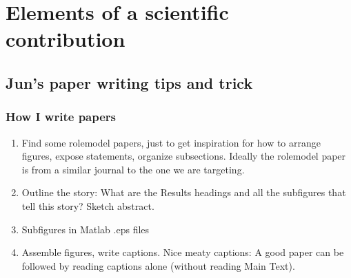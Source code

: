 \documentclass[letterpaper,10pt,english]{sphinxmanual}
\begin{document}
\chapter{Elements of a scientific contribution}
\label{\detokenize{02Elements:elements-of-a-scientific-contribution}}\label{\detokenize{02Elements::doc}}

\section{Jun’s paper writing tips and trick}
\label{\detokenize{PaperWritingTips:jun-s-paper-writing-tips-and-trick}}\label{\detokenize{PaperWritingTips:paperwritingtips}}\label{\detokenize{PaperWritingTips::doc}}

\subsection{How I write papers}
\label{\detokenize{PaperWritingTips:how-i-write-papers}}\begin{enumerate}
%
\setcounter{enumi}{-1}
\item {} 
\sphinxAtStartPar
Find some role\sphinxhyphen{}model papers, just to get inspiration for how to arrange figures, expose statements, organize subsections. Ideally the role\sphinxhyphen{}model paper is from a similar journal to the one we are targeting.

\item {} 
\sphinxAtStartPar
Outline the story: What are the Results headings and all the subfigures that tell this story? Sketch abstract.

\item {} 
\sphinxAtStartPar
Subfigures in Matlab .eps files

\item {} 
\sphinxAtStartPar
Assemble figures, write captions. Nice meaty captions: A good paper can be followed by reading captions alone (without reading Main Text).

\end{enumerate}
\end{document}
